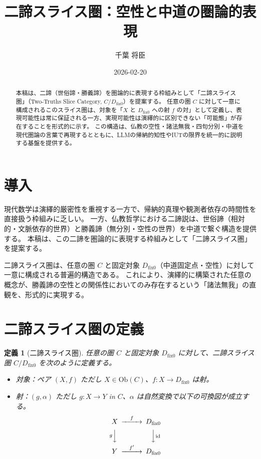 \documentclass[a4paper,11pt]{article}
\title{二諦スライス圏：空性と中道の圏論的表現}
\author{千葉 将臣}
\date{2026-02-20}
\newtheorem{definition}{定義}
\begin{document}
\maketitle

\begin{abstract}
本稿は、二諦（世俗諦・勝義諦）を圏論的に表現する枠組みとして「二諦スライス圏」（Two-Truths Slice Category, $C / D_{\mathrm{fix}0}$）を提案する。
任意の圏 $C$ に対して一意に構成されるこのスライス圏は、対象を「$X$ と $D_{\mathrm{fix}0}$ への射 $f$ の対」として定義し、表現可能性は常に保証される一方、実現可能性は演繹的に区別できない「可能態」が存在することを形式的に示す。
この構造は、仏教の空性・諸法無我・四句分別・中道を現代圏論の言葉で再現するとともに、LLMの帰納的知性やIUTの限界を統一的に説明する基盤を提供する。
\end{abstract}

\section{導入}
現代数学は演繹的厳密性を重視する一方で、帰納的真理や観測者依存の時間性を直接扱う枠組みに乏しい。
一方、仏教哲学における二諦説は、世俗諦（相対的・文脈依存的世界）と勝義諦（無分別・空性の世界）を中道で繋ぐ構造を提供する。
本稿は、この二諦を圏論的に表現する枠組みとして「二諦スライス圏」を提案する。

二諦スライス圏は、任意の圏 $C$ と固定対象 $D_{\mathrm{fix}0}$（中道固定点・空性）に対して一意に構成される普遍的構造である。
これにより、演繹的に構築された任意の概念が、勝義諦の空性との関係性においてのみ存在するという「諸法無我」の直観を、形式的に実現する。

\section{二諦スライス圏の定義}

\begin{definition}[二諦スライス圏]
任意の圏 $C$ と固定対象 $D_{\mathrm{fix}0}$ に対して、二諦スライス圏 $C / D_{\mathrm{fix}0}$ を次のように定義する。
\begin{itemize}
\item 対象：ペア $(X, f)$ ただし $X \in \mathrm{Ob}(C)$、$f : X \to D_{\mathrm{fix}0}$ は射。
\item 射：$(g, \alpha)$ ただし $g : X \to Y$ in $C$、$\alpha$ は自然変換で以下の可換図が成立する。
\[
\begin{CD}
X @>f>> D_{\mathrm{fix}0} \\
@VgVV @VV{\mathrm{id}}V \\
Y @>f'>> D_{\mathrm{fix}0}
\end{CD}
\]
\end{itemize}
\end{definition}
\end{document}

